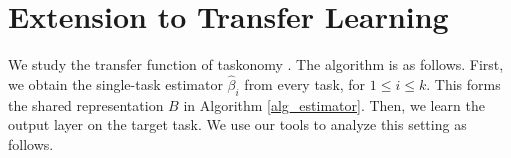 \section{Extension to Transfer Learning}

We study the transfer function of taskonomy \cite{ZSSGM18}.
The algorithm is as follows.
First, we obtain the single-task estimator $\hat{\beta}_i$ from every task, for $1\le i \le k$.
This forms the shared representation $B$ in Algorithm \ref{alg_estimator}.
Then, we learn the output layer on the target task.
We use our tools to analyze this setting as follows.







